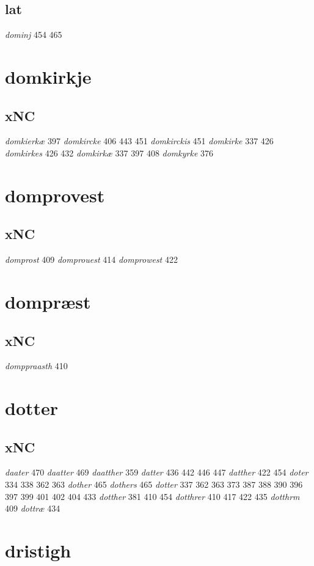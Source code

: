 \documentclass[a4paper,twocolumn]{article}
\begin{document}
\subsection{lat}
\label{sec:org157ef60}
\emph{dominj} 454 465 
\section{domkirkje}
\label{sec:org01f5be4}
\subsection{xNC}
\label{sec:orgef61ca5}
\emph{domkierkæ} 397 \emph{domkircke} 406 443 451 \emph{domkirckis} 451 \emph{domkirke} 337 426 \emph{domkirkes} 426 432 \emph{domkirkæ} 337 397 408 \emph{domkyrke} 376 
\section{domprovest}
\label{sec:orgba59349}
\subsection{xNC}
\label{sec:org675a775}
\emph{domprost} 409 \emph{domprouest} 414 \emph{domprowest} 422 
\section{dompræst}
\label{sec:org411b4e5}
\subsection{xNC}
\label{sec:org5779cdc}
\emph{domppraasth} 410 
\section{dotter}
\label{sec:org3d519f8}
\subsection{xNC}
\label{sec:orgdbd9c7a}
\emph{daater} 470 \emph{daatter} 469 \emph{daatther} 359 \emph{datter} 436 442 446 447 \emph{datther} 422 454 \emph{doter} 334 338 362 363 \emph{dother} 465 \emph{dothers} 465 \emph{dotter} 337 362 363 373 387 388 390 396 397 399 401 402 404 433 \emph{dotther} 381 410 454 \emph{dotthrer} 410 417 422 435 \emph{dotthrm} 409 \emph{dottræ} 434 
\section{dristigh}
\label{sec:org2131ac9}
\end{document}
